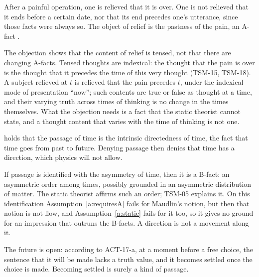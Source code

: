 \documentclass{situationist-preprint}
\begin{document}
\begin{objection}
After a painful operation, one is relieved that it is over. One is not relieved that it ends before a certain date, nor that its end precedes one's utterance, since those facts were always so. The object of relief is the pastness of the pain, an A-fact \citep{Prior1959}.
\end{objection}

\begin{reply}
The objection shows that the content of relief is tensed, not that there are changing A-facts. Tensed thoughts are indexical: the thought that the pain is over is the thought that it precedes the time of this very thought (TSM-15, TSM-18). A subject relieved at $t$ is relieved that the pain precedes $t$, under the indexical mode of presentation \enquote{now}; such contents are true or false as thought at a time, and their varying truth across times of thinking is no change in the times themselves. What the objection needs is a fact that the static theorist cannot state, and a thought content that varies with the time of thinking is not one.
\end{reply}

\begin{objection}
\citet{Maudlin2007} holds that the passage of time is the intrinsic directedness of time, the fact that time goes from past to future. Denying passage then denies that time has a direction, which physics will not allow.
\end{objection}

\begin{reply}
If passage is identified with the asymmetry of time, then it is a B-fact: an asymmetric order among times, possibly grounded in an asymmetric distribution of matter. The static theorist affirms such an order; TSM-05 explains it. On this identification Assumption~\ref{a:requiresA} fails for Maudlin's notion, but then that notion is not flow, and Assumption~\ref{a:static} fails for it too, so it gives no ground for an impression that outruns the B-facts. A direction is not a movement along it.
\end{reply}

\begin{objection}
The future is open: according to ACT-17-a, at a moment before a free choice, the sentence that it will be made lacks a truth value, and it becomes settled once the choice is made. Becoming settled is surely a kind of passage.
\end{objection}
\end{document}
